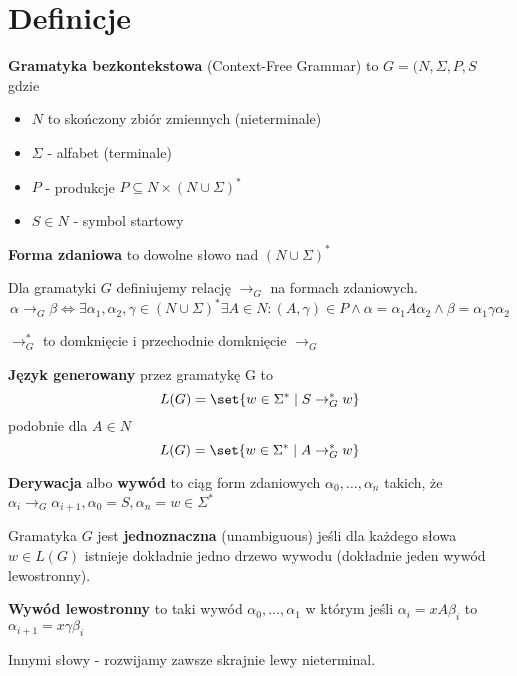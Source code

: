 \section{Definicje}
\begin{definition}
\textbf{Gramatyka bezkontekstowa} (Context-Free Grammar) to \( G = (N, \Sigma, P, S \) gdzie
\begin{itemize}
    \item \( N \) to skończony zbiór zmiennych (nieterminale)
    \item \( \Sigma \) - alfabet (terminale)
    \item \( P \) - produkcje \( P \subseteq N \times (N \cup \Sigma)^* \)
    \item \( S \in N \) - symbol startowy
\end{itemize}
\end{definition}

\begin{definition}
    \textbf{Forma zdaniowa} to dowolne słowo nad \( (N \cup \Sigma)^* \)
\end{definition}

\begin{definition}
    Dla gramatyki \( G \) definiujemy relację \( \rightarrow_G \) na formach zdaniowych.
    \[
        \alpha \rightarrow_G \beta \iff
        \exists \alpha_1, \alpha_2, \gamma \in (N \cup \Sigma)^* \exists A \in N : (A, \gamma) \in P \land
        \alpha = \alpha_1  A \alpha_2 \land \beta = \alpha_1 \gamma \alpha_2
    \]
\end{definition}
\begin{definition}
    \( \rightarrow_G^* \) to domknięcie i przechodnie domknięcie \( \rightarrow_G \)
\end{definition}
\begin{definition}
    \textbf{Język  generowany} przez gramatykę G to 
    \[
        L(G) = \set{w \in \Sigma^* \mid S \rightarrow_G^* w}
    \]
    podobnie dla \( A \in N \)
    \[
        L(G) = \set{w \in \Sigma^* \mid A \rightarrow_G^* w}
    \]
\end{definition}
\begin{definition}
    \textbf{Derywacja} albo \textbf{wywód} to ciąg form zdaniowych \( \alpha_0, \dots, \alpha_n \)
    takich, że \( \alpha_i \rightarrow_G \alpha_{i+1}, \alpha_0 = S, \alpha_n = w \in \Sigma^*\)
\end{definition}
\begin{definition}
    Gramatyka \( G \) jest \textbf{jednoznaczna} (unambiguous) jeśli dla każdego słowa \( w \in L(G) \) istnieje dokładnie jedno drzewo wywodu
    (dokładnie jeden wywód lewostronny).
\end{definition}
\begin{definition}
    \textbf{Wywód lewostronny} to taki wywód \( \alpha_0, \dots, \alpha_1 \)
    w którym jeśli \( \alpha_i = xA\beta_i \)
    to \( \alpha_{i+1} = x\gamma\beta_i \)
    
    Innymi słowy - rozwijamy zawsze skrajnie lewy nieterminal.
\end{definition}


